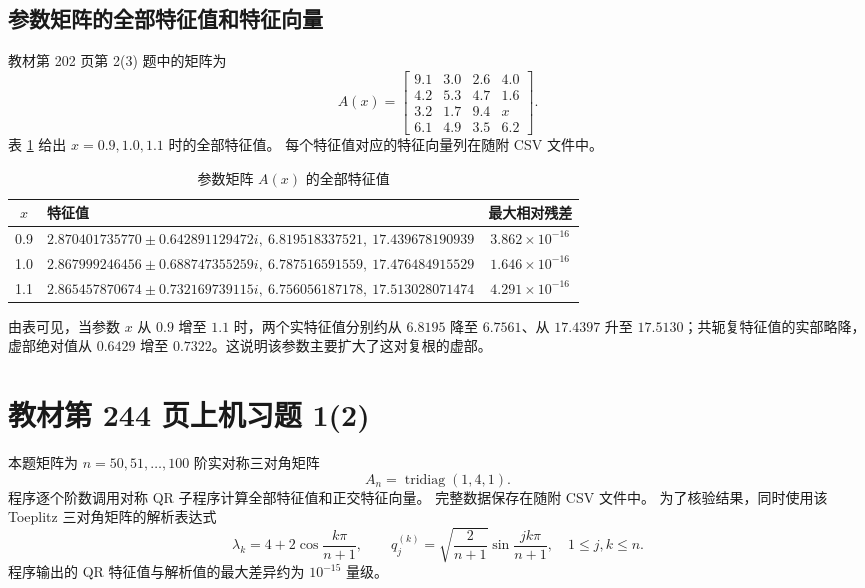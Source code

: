 \documentclass[a4paper,11pt]{article}
\begin{document}
\subsection{参数矩阵的全部特征值和特征向量}
教材第 202 页第 2(3) 题中的矩阵为
\[
A(x)=
\begin{bmatrix}
9.1&3.0&2.6&4.0\\
4.2&5.3&4.7&1.6\\
3.2&1.7&9.4&x\\
6.1&4.9&3.5&6.2
\end{bmatrix}.
\]
表 \ref{tab:p202-param} 给出 $x=0.9,1.0,1.1$ 时的全部特征值。
每个特征值对应的特征向量列在随附 CSV 文件中。

\begin{table}[H]
\centering
\small
\caption{参数矩阵 $A(x)$ 的全部特征值}
\label{tab:p202-param}
\begin{tabular}{clc}
\toprule
$x$ & 特征值 & 最大相对残差 \\
\midrule
0.9 & $2.870401735770\pm0.642891129472i,\ 6.819518337521,\ 17.439678190939$
& $3.862\times10^{-16}$ \\
1.0 & $2.867999246456\pm0.688747355259i,\ 6.787516591559,\ 17.476484915529$
& $1.646\times10^{-16}$ \\
1.1 & $2.865457870674\pm0.732169739115i,\ 6.756056187178,\ 17.513028071474$
& $4.291\times10^{-16}$ \\
\bottomrule
\end{tabular}
\end{table}

由表可见，当参数 $x$ 从 $0.9$ 增至 $1.1$ 时，两个实特征值分别约从
$6.8195$ 降至 $6.7561$、从 $17.4397$ 升至 $17.5130$；共轭复特征值的实部略降，
虚部绝对值从 $0.6429$ 增至 $0.7322$。这说明该参数主要扩大了这对复根的虚部。

\section{教材第 244 页上机习题 1(2)}
本题矩阵为 $n=50,51,\ldots,100$ 阶实对称三对角矩阵
\[
    A_n=\operatorname{tridiag}(1,4,1).
\]
程序逐个阶数调用对称 QR 子程序计算全部特征值和正交特征向量。
完整数据保存在随附 CSV 文件中。
为了核验结果，同时使用该 Toeplitz 三对角矩阵的解析表达式
\[
    \lambda_k=4+2\cos\frac{k\pi}{n+1},\qquad
    q_j^{(k)}=\sqrt{\frac{2}{n+1}}\sin\frac{jk\pi}{n+1},
    \quad 1\le j,k\le n .
\]
程序输出的 QR 特征值与解析值的最大差异约为 $10^{-15}$ 量级。
\end{document}
